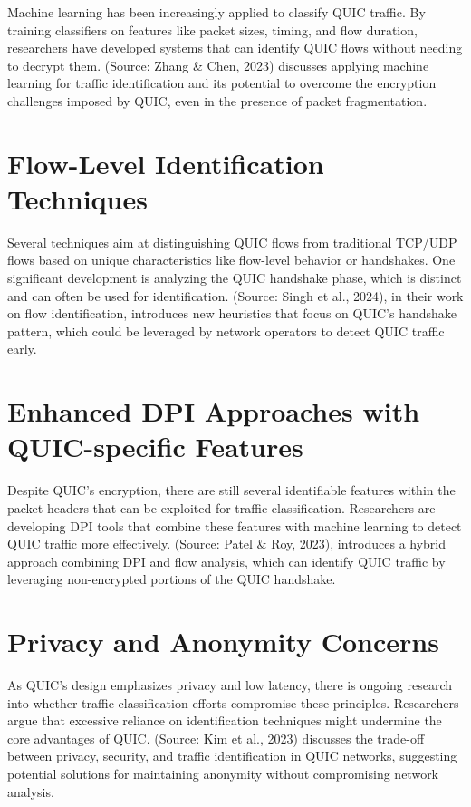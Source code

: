 \documentclass[a4paper, 10pt]{article}
\begin{document}
\begin{CJK}{UTF8}{gbsn}
	Machine learning has been increasingly applied to classify QUIC traffic. By training classifiers on features like packet sizes, timing, and flow duration, researchers have developed systems that can identify QUIC flows without needing to decrypt them.
	(Source: Zhang \& Chen, 2023) discusses applying machine learning for traffic identification and its potential to overcome the encryption challenges imposed by QUIC, even in the presence of packet fragmentation.
	
	
	\section{Flow-Level Identification Techniques} 
	
	Several techniques aim at distinguishing QUIC flows from traditional TCP/UDP flows based on unique characteristics like flow-level behavior or handshakes. One significant development is analyzing the QUIC handshake phase, which is distinct and can often be used for identification.
	(Source: Singh et al., 2024), in their work on flow identification, introduces new heuristics that focus on QUIC's handshake pattern, which could be leveraged by network operators to detect QUIC traffic early.
	\section{Enhanced DPI Approaches with QUIC-specific Features}
	
	Despite QUIC's encryption, there are still several identifiable features within the packet headers that can be exploited for traffic classification. Researchers are developing DPI tools that combine these features with machine learning to detect QUIC traffic more effectively.
	(Source: Patel \& Roy, 2023), introduces a hybrid approach combining DPI and flow analysis, which can identify QUIC traffic by leveraging non-encrypted portions of the QUIC handshake.
	\section{Privacy and Anonymity Concerns}
	As QUIC's design emphasizes privacy and low latency, there is ongoing research into whether traffic classification efforts compromise these principles. Researchers argue that excessive reliance on identification techniques might undermine the core advantages of QUIC.
	(Source: Kim et al., 2023) discusses the trade-off between privacy, security, and traffic identification in QUIC networks, suggesting potential solutions for maintaining anonymity without compromising network analysis.

\end{CJK}
\end{document}
